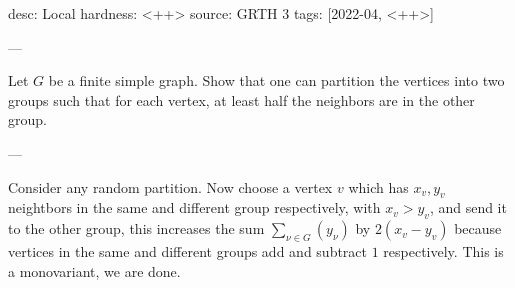 desc: Local
hardness: <++>
source: GRTH 3
tags: [2022-04, <++>]

---

Let $G$ be a finite simple graph.
Show that one can partition the vertices into two groups such that
for each vertex, at least half the neighbors are in the other group.

---

Consider any random partition. Now choose a vertex $v$
which has $x_v,y_v$ neightbors in the same and different group respectively,
with $x_v > y_v$, and send it to the other group, this increases the sum
$\sum_{\nu \in G} (y_\nu)$ by $2(x_v - y_v)$ because
vertices in the same and different groups add and subtract $1$
respectively. This is a monovariant, we are done.
